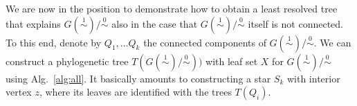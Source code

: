 \documentclass[smallextended]{svjour3}
\newcommand{\rev}[1]{\begingroup\color{blue}#1\endgroup}
\newcommand{\Ro}{\mathrel{\overset{0}{\sim}}}
\newcommand{\Rl}{\mathrel{\overset{1}{\sim}}}
\begin{document}
%  



We are now in the position to demonstrate how to obtain a least resolved
tree that explains $G(\Rl)/\Ro$ also in the case that $G(\Rl)/\Ro$ itself
is not connected. To this end, denote by $Q_1,\dots Q_k$ the connected
components of $G(\Rl)/\Ro$. We can construct a \rev{phylogenetic tree
  $T(G(\Rl)/\Ro))$ with leaf set $X$} for $G(\Rl)/\Ro$ using Alg.\
\ref{alg:all}. It basically amounts to constructing a star $S_k$ with
interior vertex $z$, where its leaves are identified with the trees
$T(Q_i)$.
\end{document}

